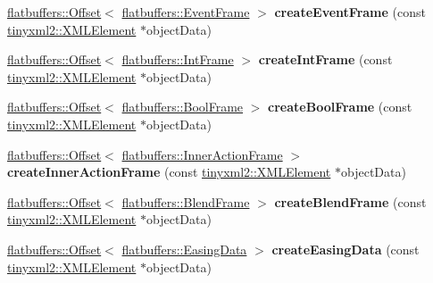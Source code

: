 \begin{DoxyCompactItemize}
\hyperlink{structflatbuffers_1_1Offset}{flatbuffers\+::\+Offset}$<$ \hyperlink{structflatbuffers_1_1EventFrame}{flatbuffers\+::\+Event\+Frame} $>$ {\bfseries create\+Event\+Frame} (const \hyperlink{classtinyxml2_1_1XMLElement}{tinyxml2\+::\+X\+M\+L\+Element} $\ast$object\+Data)
\item 
\mbox{\label{classcocostudio_1_1FlatBuffersSerialize_a0076d990ab8ccb43ba939eecd912ea95}} 
\hyperlink{structflatbuffers_1_1Offset}{flatbuffers\+::\+Offset}$<$ \hyperlink{structflatbuffers_1_1IntFrame}{flatbuffers\+::\+Int\+Frame} $>$ {\bfseries create\+Int\+Frame} (const \hyperlink{classtinyxml2_1_1XMLElement}{tinyxml2\+::\+X\+M\+L\+Element} $\ast$object\+Data)
\item 
\mbox{\label{classcocostudio_1_1FlatBuffersSerialize_af4e9ffee45c442c46fc2ab4d361ab69f}} 
\hyperlink{structflatbuffers_1_1Offset}{flatbuffers\+::\+Offset}$<$ \hyperlink{structflatbuffers_1_1BoolFrame}{flatbuffers\+::\+Bool\+Frame} $>$ {\bfseries create\+Bool\+Frame} (const \hyperlink{classtinyxml2_1_1XMLElement}{tinyxml2\+::\+X\+M\+L\+Element} $\ast$object\+Data)
\item 
\mbox{\label{classcocostudio_1_1FlatBuffersSerialize_a576caf078b01a9962fc5ec78711bc901}} 
\hyperlink{structflatbuffers_1_1Offset}{flatbuffers\+::\+Offset}$<$ \hyperlink{structflatbuffers_1_1InnerActionFrame}{flatbuffers\+::\+Inner\+Action\+Frame} $>$ {\bfseries create\+Inner\+Action\+Frame} (const \hyperlink{classtinyxml2_1_1XMLElement}{tinyxml2\+::\+X\+M\+L\+Element} $\ast$object\+Data)
\item 
\mbox{\label{classcocostudio_1_1FlatBuffersSerialize_a02b5645ac4398429e48c757afcbb1652}} 
\hyperlink{structflatbuffers_1_1Offset}{flatbuffers\+::\+Offset}$<$ \hyperlink{structflatbuffers_1_1BlendFrame}{flatbuffers\+::\+Blend\+Frame} $>$ {\bfseries create\+Blend\+Frame} (const \hyperlink{classtinyxml2_1_1XMLElement}{tinyxml2\+::\+X\+M\+L\+Element} $\ast$object\+Data)
\item 
\mbox{\label{classcocostudio_1_1FlatBuffersSerialize_ae15ac2d582406b373c74127bbe1fea42}} 
\hyperlink{structflatbuffers_1_1Offset}{flatbuffers\+::\+Offset}$<$ \hyperlink{structflatbuffers_1_1EasingData}{flatbuffers\+::\+Easing\+Data} $>$ {\bfseries create\+Easing\+Data} (const \hyperlink{classtinyxml2_1_1XMLElement}{tinyxml2\+::\+X\+M\+L\+Element} $\ast$object\+Data)

\end{DoxyCompactItemize}
